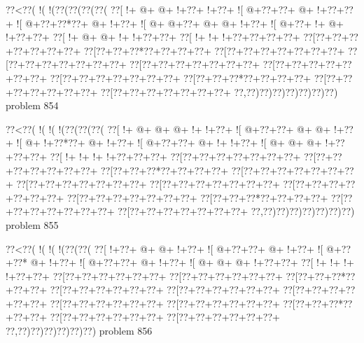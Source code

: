 \vbox{\vbox{\goo
\0??<\0??(\- !(\- !(\0??(\0??(\0??(\0??(
\0??[\- !+\- @+\- @+\- !+\0??+\- !+\0??+
\- ![\- @+\0??+\0??+\- @+\- !+\0??+\0??+
\- ![\- @+\0??+\0??*\0??+\- @+\- !+\0??+
\- ![\- @+\- @+\0??+\- @+\- @+\- !+\0??+
\- ![\- @+\0??+\- !+\- @+\- !+\0??+\0??+
\0??[\- !+\- @+\- @+\- !+\- !+\0??+\0??+
\0??[\- !+\- !+\- !+\0??+\0??+\0??+\0??+
\0??[\0??+\0??+\0??+\0??+\0??+\0??+\0??+
\0??[\0??+\0??+\0??*\0??+\0??+\0??+\0??+
\0??[\0??+\0??+\0??+\0??+\0??+\0??+\0??+
\0??[\0??+\0??+\0??+\0??+\0??+\0??+\0??+
\0??[\0??+\0??+\0??+\0??+\0??+\0??+\0??+
\0??[\0??+\0??+\0??+\0??+\0??+\0??+\0??+
\0??[\0??+\0??+\0??+\0??+\0??+\0??+\0??+
\0??[\0??+\0??+\0??*\0??+\0??+\0??+\0??+
\0??[\0??+\0??+\0??+\0??+\0??+\0??+\0??+
\0??[\0??+\0??+\0??+\0??+\0??+\0??+\0??+
\0??,\0??)\0??)\0??)\0??)\0??)\0??)\0??)
}
\hfil problem 854\hfil\break
}

\vbox{\vbox{\goo
\0??<\0??(\- !(\- !(\- !(\0??(\0??(\0??(
\0??[\- !+\- @+\- @+\- @+\- !+\- !+\0??+
\- ![\- @+\0??+\0??+\- @+\- @+\- !+\0??+
\- ![\- @+\- !+\0??*\0??+\- @+\- !+\0??+
\- ![\- @+\0??+\0??+\- @+\- !+\- !+\0??+
\- ![\- @+\- @+\- @+\- !+\0??+\0??+\0??+
\0??[\- !+\- !+\- !+\- !+\0??+\0??+\0??+
\0??[\0??+\0??+\0??+\0??+\0??+\0??+\0??+
\0??[\0??+\0??+\0??+\0??+\0??+\0??+\0??+
\0??[\0??+\0??+\0??*\0??+\0??+\0??+\0??+
\0??[\0??+\0??+\0??+\0??+\0??+\0??+\0??+
\0??[\0??+\0??+\0??+\0??+\0??+\0??+\0??+
\0??[\0??+\0??+\0??+\0??+\0??+\0??+\0??+
\0??[\0??+\0??+\0??+\0??+\0??+\0??+\0??+
\0??[\0??+\0??+\0??+\0??+\0??+\0??+\0??+
\0??[\0??+\0??+\0??*\0??+\0??+\0??+\0??+
\0??[\0??+\0??+\0??+\0??+\0??+\0??+\0??+
\0??[\0??+\0??+\0??+\0??+\0??+\0??+\0??+
\0??,\0??)\0??)\0??)\0??)\0??)\0??)\0??)
}
\hfil problem 855\hfil\break
}

\vbox{\vbox{\goo
\0??<\0??(\- !(\- !(\- !(\0??(\0??(
\0??[\- !+\0??+\- @+\- @+\- !+\0??+
\- ![\- @+\0??+\0??+\- @+\- !+\0??+
\- ![\- @+\0??+\0??*\- @+\- !+\0??+
\- ![\- @+\0??+\0??+\- @+\- !+\0??+
\- ![\- @+\- @+\- @+\- !+\0??+\0??+
\0??[\- !+\- !+\- !+\- !+\0??+\0??+
\0??[\0??+\0??+\0??+\0??+\0??+\0??+
\0??[\0??+\0??+\0??+\0??+\0??+\0??+
\0??[\0??+\0??+\0??*\0??+\0??+\0??+
\0??[\0??+\0??+\0??+\0??+\0??+\0??+
\0??[\0??+\0??+\0??+\0??+\0??+\0??+
\0??[\0??+\0??+\0??+\0??+\0??+\0??+
\0??[\0??+\0??+\0??+\0??+\0??+\0??+
\0??[\0??+\0??+\0??+\0??+\0??+\0??+
\0??[\0??+\0??+\0??*\0??+\0??+\0??+
\0??[\0??+\0??+\0??+\0??+\0??+\0??+
\0??[\0??+\0??+\0??+\0??+\0??+\0??+
\0??,\0??)\0??)\0??)\0??)\0??)\0??)
}
\hfil problem 856\hfil\break
}

